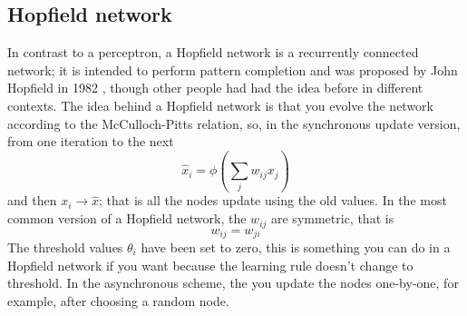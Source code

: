 \documentclass[12pt]{article}
\begin{document}
\subsection*{Hopfield network}

In contrast to a perceptron, a Hopfield network is a recurrently
connected network; it is intended to perform pattern completion and
was proposed by John Hopfield in 1982 \cite{Hopfield1982}, though other people had had the
idea before in different contexts. The idea behind a Hopfield network
is that you evolve the network according to the McCulloch-Pitts
relation, so, in the synchronous update version, from one iteration to
the next
\begin{equation}
\hat{x}_i=\phi\left(\sum_j w_{ij} x_j\right)
\end{equation}
and then $x_i\rightarrow \hat{x}$; that is all the nodes update using
the old values. In the most common version of a Hopfield network, the $w_{ij}$ are symmetric, that is
\begin{equation}
w_{ij}=w_{ji}
\end{equation}
The threshold values $\theta_i$ have been set to zero, this is
something you can do in a Hopfield network if you want because the
learning rule doesn't change to threshold. In the asynchronous scheme,
the you update the nodes one-by-one, for example, after choosing a
random node.
\end{document}
